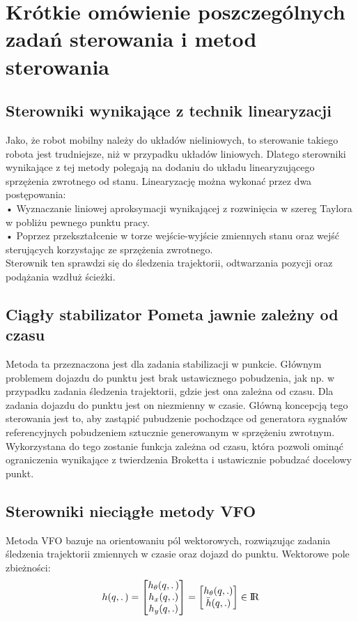 \documentclass[12pt, a4paper, polish]{article}
\begin{document}
\section{Krótkie omówienie poszczególnych zadań sterowania i metod sterowania}
\subsection{Sterowniki wynikające z technik linearyzacji}
Jako, że robot mobilny należy do układów nieliniowych, to sterowanie takiego robota jest trudniejsze, niż w przypadku układów liniowych. Dlatego sterowniki wynikające z tej metody polegają na dodaniu do układu linearyzującego sprzężenia zwrotnego od stanu. Linearyzację można wykonać przez dwa postępowania:\\
• Wyznaczanie liniowej aproksymacji wynikającej z rozwinięcia w szereg Taylora w pobliżu pewnego punktu pracy. \\
• Poprzez przekształcenie w torze wejście-wyjście zmiennych stanu oraz wejść sterujących korzystając ze sprzężenia zwrotnego.\\
Sterownik ten sprawdzi się do śledzenia trajektorii, odtwarzania pozycji oraz podążania wzdłuż ścieżki. 
\subsection{Ciągły stabilizator Pometa jawnie zależny od czasu}
Metoda ta przeznaczona jest dla zadania stabilizacji w punkcie. Głównym problemem dojazdu do punktu jest brak ustawicznego pobudzenia, jak np. w przypadku zadania śledzenia trajektorii, gdzie jest ona zależna od czasu. Dla zadania dojazdu do punktu jest on niezmienny w czasie.  
Główną koncepcją tego sterowania jest to, aby zastąpić pubudzenie pochodzące od generatora sygnałów referencyjnych pobudzeniem sztucznie generowanym w sprzężeniu zwrotnym. Wykorzystana do tego zostanie funkcja zależna od czasu, która pozwoli ominąć ograniczenia wynikające z twierdzenia Broketta i ustawicznie pobudzać docelowy punkt.
\subsection{Sterowniki nieciągłe metody VFO}
Metoda VFO bazuje na orientowaniu pól wektorowych, rozwiązując zadania śledzenia trajektorii zmiennych w czasie oraz dojazd do punktu. Wektorowe pole zbieżności:
$$
h(q,\ldotp)=\begin{bmatrix}h_\theta(q,\ldotp) \\ h_x(q,.) \\ h_y(q,.)\end{bmatrix}=\begin{bmatrix}h_\theta(q, .) \\ \bar{h}(q,.) \end{bmatrix}\in \rm I\!R
$$
\end{document}
